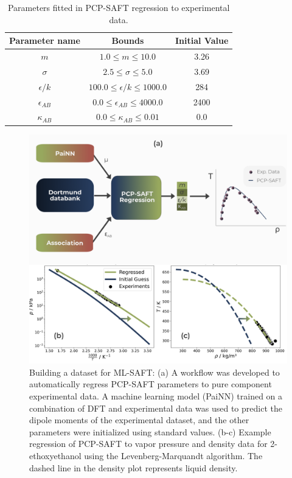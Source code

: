 \begin{table}
    \centering
    \caption{Parameters fitted in PCP-SAFT regression to experimental data.}
    \label{tab:regression_params}
    \begin{tabular}{ccc}
        Parameter name & Bounds & Initial Value \\
        \hline
        $m$ & $1.0 \leq m \leq 10.0$ & 3.26 \\
        $\sigma$ & $2.5 \leq \sigma \leq 5.0$ & 3.69 \\
        $\epsilon/k$ & $100.0 \leq \epsilon/k \leq 1000.0$ & 284 \\
        $\epsilon_{AB}$ & $0.0 \leq \epsilon_{AB} \leq 4000.0$ & 2400 \\
        $\kappa_{AB}$ & $0.0 \leq \kappa_{AB} \leq 0.01$ & 0.0 \\
        \hline
    \end{tabular}
\end{table}


\begin{figure}
    \centering
    \includegraphics[width=\textwidth]{gfx/Chapter08/deepsaft_regression.png}
    \caption{Building a dataset for ML-SAFT: (a) A workflow was developed to automatically regress PCP-SAFT parameters to pure component experimental data. A machine learning model (PaiNN) trained on  a combination of DFT and experimental data was used to predict the dipole moments of the experimental dataset, and the other parameters were initialized using standard values. (b-c) Example regression of PCP-SAFT to vapor pressure and density data for 2-ethoxyethanol using the Levenberg-Marquandt algorithm. The dashed line in the density plot represents liquid density.}
    \label{fig:ML-SAFT_regression}
\end{figure}

